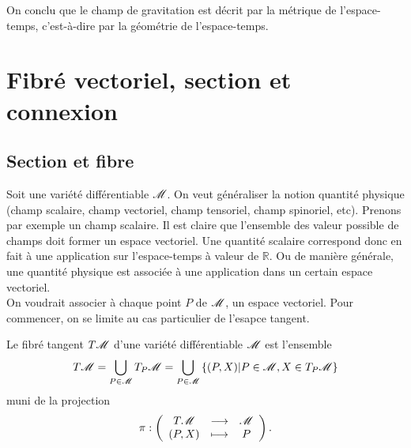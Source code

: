 \documentclass[a4paper,11pt]{report}
\begin{document}
                On conclu que le champ de gravitation est décrit par la métrique de l'espace-temps, c'est-à-dire par la géométrie de l'espace-temps.
            
        \section{Fibré vectoriel, section et connexion}
        
            \subsection{Section et fibre}
        
                Soit une variété différentiable $\mathscr{M}$. On veut généraliser la notion quantité physique (champ scalaire, champ vectoriel, champ tensoriel, champ spinoriel, etc). Prenons par exemple un champ scalaire. Il est claire que l'ensemble des valeur possible de champs doit former un espace vectoriel. Une quantité scalaire correspond donc en fait à une application sur l'espace-temps à valeur de $\mathbb{R}$. Ou de manière générale, une quantité physique est associée à une application dans un certain espace vectoriel.\\
                
                On voudrait associer à chaque point $P$ de $\mathscr{M}$, un espace vectoriel. Pour commencer, on se limite au cas particulier de l'esapce tangent.
                
                \begin{definition}
                    Le fibré tangent $T\mathscr{M}$ d'une variété différentiable $\mathscr{M}$ est l'ensemble
                    \begin{equation}
                        T\mathscr{M} = \bigcup_{P\in\mathscr{M}}T_P\mathscr{M} = \bigcup_{P\in\mathscr{M}}\left\{ (P,X)|P\in\mathscr{M}, X\in T_P\mathscr{M} \right\}
                    \end{equation}
                    muni de la projection
                    \begin{equation}
                    \pi:\left(
                    \begin{array}{ccc}
                        T\mathscr{M} & \longrightarrow & \mathscr{M} \\
                        (P,X) & \longmapsto & P
                    \end{array}
                    \right).
                    \end{equation}
                \end{definition}
                
\end{document}
